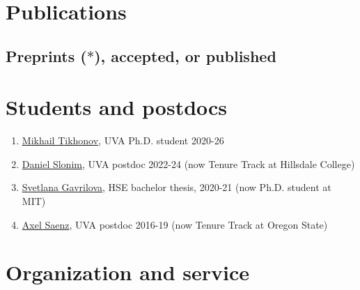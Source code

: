 \documentclass[letterpaper,11pt]{article}
\begin{document}
\begin{itemize}
\end{itemize}

\section*{Publications}

\subsection*{Preprints ($*$), accepted, or published}



\section*{Students and postdocs}

\begin{enumerate}
    \item \href{https://mtikhonov.com}{Mikhail Tikhonov}, UVA Ph.D. student 2020-26
    \item \href{https://danielslonim.github.io}{Daniel Slonim}, UVA postdoc 2022-24 (now Tenure Track at Hillsdale College)
    \item \href{https://math.mit.edu/directory/profile.html?pid=2588}{Svetlana Gavrilova},  HSE bachelor thesis, 2020-21 (now Ph.D. student at MIT)
    \item \href{https://sites.google.com/view/axelsaenz}{Axel Saenz}, UVA postdoc 2016-19 (now Tenure Track at Oregon State)
\end{enumerate}

\section*{Organization and service}
\end{document}
